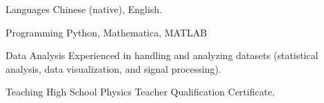 

\begin{cvskills}

  \cvskill
    {Languages} %
    {Chinese (native), English.} %

  \cvskill
    {Programming} %
    { Python, Mathematica, MATLAB} %

  \cvskill
    {Data Analysis} %
    {Experienced in handling and analyzing datasets (statistical analysis, data visualization, and signal processing).} %

  \cvskill
    {Teaching} %
    {High School Physics Teacher Qualification Certificate.} %


\end{cvskills}
